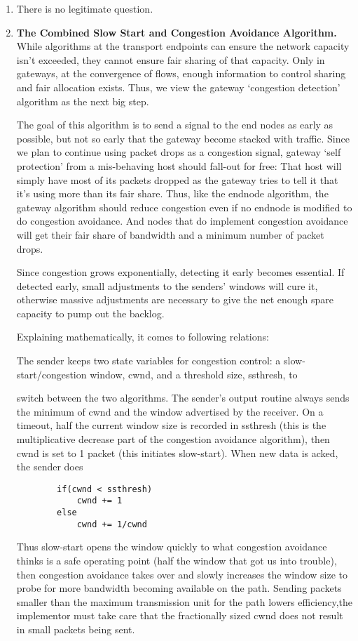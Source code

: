 \documentclass[12pt]{article}
\begin{document}
\begin{enumerate}
    \item There is no legitimate question.
    
    \item \textbf{The Combined Slow Start and Congestion Avoidance Algorithm.}\\
    While algorithms at the transport endpoints can ensure the network capacity isn’t exceeded, they cannot ensure fair sharing of that capacity. Only in gateways, at the convergence of flows, enough information to control sharing and fair allocation exists. Thus, we view the gateway ‘congestion detection’ algorithm as the next big step.

    The goal of this algorithm is to send a signal to the end nodes
    as early as possible, but not so early that the gateway become stacked with traffic. Since we plan to continue using packet
    drops as a congestion signal, gateway ‘self protection’ from
    a mis-behaving host should fall-out for free: That host will
    simply have most of its packets dropped as the gateway tries
    to tell it that it’s using more than its fair share. Thus, like
    the endnode algorithm, the gateway algorithm should reduce
    congestion even if no endnode is modified to do congestion
    avoidance. And nodes that do implement congestion avoidance
    will get their fair share of bandwidth and a minimum
    number of packet drops.

    Since congestion grows exponentially, detecting it early
    becomes essential. If detected early, small adjustments to the
    senders’ windows will cure it, otherwise massive adjustments
    are necessary to give the net enough spare capacity
    to pump out the backlog.
    
    Explaining mathematically, it comes to following relations:
    
    The sender keeps two state variables for congestion control: a slow-
start/congestion window, cwnd, and a threshold size, ssthresh, to

switch between the two algorithms. The sender’s output routine
always sends the minimum of cwnd and the window advertised by
the receiver. On a timeout, half the current window size is recorded
in ssthresh (this is the multiplicative decrease part of the congestion
avoidance algorithm), then cwnd is set to 1 packet (this initiates
slow-start). When new data is acked, the sender does
\begin{center}
    \begin{verbatim}
        if(cwnd < ssthresh)
            cwnd += 1
        else
            cwnd += 1/cwnd
    \end{verbatim}
\end{center}

Thus slow-start opens the window quickly to what congestion
avoidance thinks is a safe operating point (half the window that got
us into trouble), then congestion avoidance takes over and slowly
increases the window size to probe for more bandwidth becoming
available on the path. Sending packets smaller than the maximum
transmission unit for the path lowers efficiency,the implementor
must take care that the fractionally sized cwnd does not result in
small packets being sent.
\end{enumerate}
\end{document}

